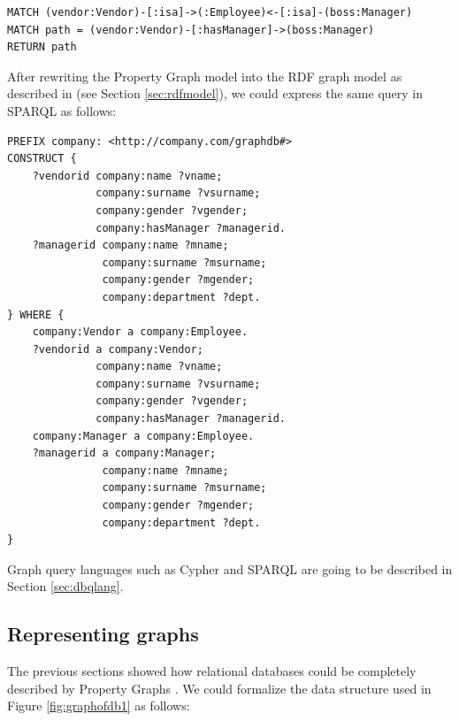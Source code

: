 \begin{lstlisting}[language=Cypher]
MATCH (vendor:Vendor)-[:isa]->(:Employee)<-[:isa]-(boss:Manager)
MATCH path = (vendor:Vendor)-[:hasManager]->(boss:Manager)
RETURN path
\end{lstlisting}

After rewriting the Property Graph model into the RDF graph model as described in \cite{DasSPCB14} (see Section \vref{sec:rdfmodel}), we could express the same query in SPARQL as follows:

\begin{lstlisting}[language=SPARQL,mathescape=true,label=sqlrefch3]
PREFIX company: <http://company.com/graphdb#>
CONSTRUCT { 
	?vendorid company:name ?vname;
	          company:surname ?vsurname;
	          company:gender ?vgender;
	          company:hasManager ?managerid.
	?managerid company:name ?mname;
	           company:surname ?msurname;
	           company:gender ?mgender;
	           company:department ?dept.
} WHERE {
    company:Vendor a company:Employee.
    ?vendorid a company:Vendor;
	          company:name ?vname;
	          company:surname ?vsurname;
	          company:gender ?vgender;
	          company:hasManager ?managerid.
    company:Manager a company:Employee.
    ?managerid a company:Manager;
	           company:name ?mname;
	           company:surname ?msurname;
	           company:gender ?mgender;
	           company:department ?dept.
}
\end{lstlisting}

Graph query languages such as Cypher and SPARQL are going to be described in Section \vref{sec:dbqlang}.

\subsection{Representing graphs}
The previous sections showed how relational databases could be completely described by Property Graphs \cite{Neo4jAlg}.  We could formalize the data structure used in Figure \ref{fig:graphofdb1} as follows:

